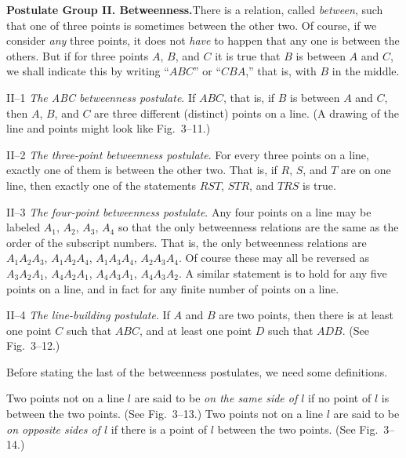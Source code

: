 \documentclass[11pt]{book}
\theoremstyle{bkplain}
\theoremstyle{XIplainnote}
\theoremstyle{bkplain}
\theoremstyle{bkplain}
\begin{document}
\medskip
\noindent\textbf{Postulate Group II. Betweenness.}\quad There is a relation,
called \emph{between}, such that one of three points is sometimes between the
other two. Of course, if we consider \emph{any} three points, it does not
\emph{have} to happen that any one is between the others. But if for three points
$A$, $B$, and $C$ it is true that $B$ is between $A$ and $C$, we shall indicate
this by writing ``$ABC$'' or ``$CBA$,'' that is, with $B$ in the middle.

\medskip
\noindent II--1 \emph{The ABC betweenness postulate}. If $ABC$, that is, if $B$
is between $A$ and $C$, then $A$, $B$, and $C$ are three different (distinct)
points on a line. (A drawing of the line and points might look like Fig.~3--11.)

\FIGIIIELEVENTWELVE

\medskip
\noindent II--2 \emph{The three-point betweenness postulate}. For every three
points on a line, exactly one of them is between the other two. That is, if $R$,
$S$, and $T$ are on one line, then exactly one of the statements $RST$, $STR$,
and $TRS$ is true.

\medskip
\noindent II--3 \emph{The four-point betweenness postulate}. Any four points on a
line may be labeled $A_1$, $A_2$, $A_3$, $A_4$ so that the only betweenness
relations are the same as the order of the subscript numbers. That is, the only
betweenness relations are $A_1A_2A_3$, $A_1A_2A_4$, $A_1A_3A_4$, $A_2A_3A_4$. Of
course these may all be reversed as $A_3A_2A_1$, $A_4A_2A_1$, $A_4A_3A_1$,
$A_4A_3A_2$. A similar statement is to hold for any five points on a line, and in
fact for any finite number of points on a line.

\medskip
\noindent II--4 \emph{The line-building postulate}. If $A$ and $B$ are two
points, then there is at least one point $C$ such that $ABC$, and at least one
point $D$ such that $ADB$. (See Fig.~3--12.)

\medskip
Before stating the last of the betweenness postulates, we need some definitions.

\begin{definition}
Two points not on a line $l$ are said to be \emph{on the same side of $l$} if no
point of $l$ is between the two points. (See Fig.~3--13.) Two points not on a
line $l$ are said to be \emph{on opposite sides of $l$} if there is a point of
$l$ between the two points. (See Fig.~3--14.)
\end{definition}

\FIGIIITHIRTEENFOURTEEN
\end{document}

